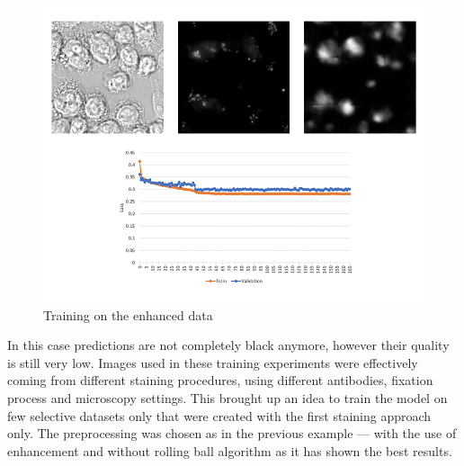 \begin{figure}[htb]
	\begin{center}
		\includegraphics[width=\linewidth]{bilder/golgi/enhanced-crop.png}
		\caption{Training on the enhanced data}\label{fig:golgi-enhanced-predictions}
	\end{center}
\end{figure}
In this case predictions are not completely black anymore, however their quality is still very low. Images used in these training experiments were effectively coming from different staining procedures, using different antibodies, fixation process and microscopy settings. This brought up an idea to train the model on few selective datasets only that were created with the first staining approach only. The preprocessing was chosen as in the previous example --- with the use of enhancement and without rolling ball algorithm as it has shown the best results.

